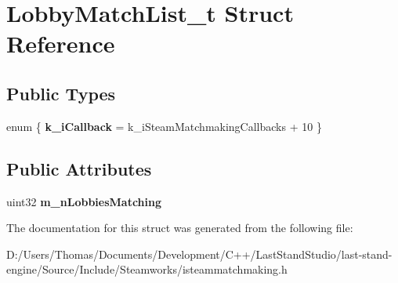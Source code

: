 \hypertarget{structLobbyMatchList__t}{}\section{Lobby\+Match\+List\+\_\+t Struct Reference}
\label{structLobbyMatchList__t}
\subsection*{Public Types}
\begin{DoxyCompactItemize}
\item 
\hypertarget{structLobbyMatchList__t_a56551c215516145f8f65843cc57b76c7}{}enum \{ {\bfseries k\+\_\+i\+Callback} = k\+\_\+i\+Steam\+Matchmaking\+Callbacks + 10
 \}\label{structLobbyMatchList__t_a56551c215516145f8f65843cc57b76c7}

\end{DoxyCompactItemize}
\subsection*{Public Attributes}
\begin{DoxyCompactItemize}
\item 
\hypertarget{structLobbyMatchList__t_ae042332e8d7decff351ee3b4817762ca}{}uint32 {\bfseries m\+\_\+n\+Lobbies\+Matching}\label{structLobbyMatchList__t_ae042332e8d7decff351ee3b4817762ca}

\end{DoxyCompactItemize}


The documentation for this struct was generated from the following file\+:\begin{DoxyCompactItemize}
\item 
D\+:/\+Users/\+Thomas/\+Documents/\+Development/\+C++/\+Last\+Stand\+Studio/last-\/stand-\/engine/\+Source/\+Include/\+Steamworks/isteammatchmaking.\+h\end{DoxyCompactItemize}
